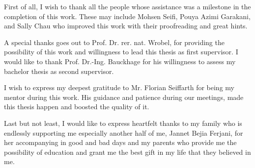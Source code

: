 First of all, I wish to thank all the people whose assistance was a milestone in the completion of
this work. These may include Mohsen Seifi, Pouya Azimi Garakani, and Sally Chau who improved this
work with their proofreading and great hints. 

A special thanks goes out to Prof. Dr. rer. nat. Wrobel, for providing the possibility of this
work and willingness to lead this thesis as first supervisor. I would like to thank Prof. Dr.-Ing.
Bauckhage for his willingness to assess my bachelor thesis as second supervisor.

I wish to express my deepest gratitude to Mr. Florian Seiffarth for being my mentor during this
work. His guidance and patience during our meetings, made this thesis happen and boosted the quality
of it.  

Last but not least, I would like to express heartfelt thanks to my family who is endlessly
supporting me especially another half of me, Jannet Bejia Ferjani, for her accompanying in good and
bad days and my parents who provide me the possibility of education and grant me the best
gift in my life that they believed in me. 